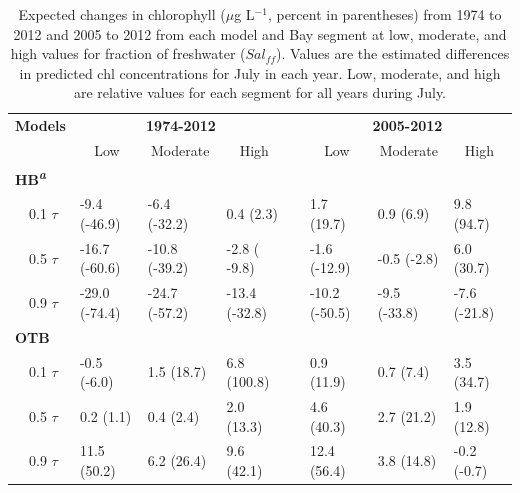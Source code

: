\documentclass{svjour3}\usepackage[]{graphicx}\usepackage[]{color}
\newcommand{\mugl}{$\mu$g L$^{-1}$}
\begin{document}
\begin{table}[!tbp]
\caption{Expected changes in chlorophyll (\mugl, percent in parentheses) from 1974 to 2012 and 2005 to 2012 from each model and Bay segment at low, moderate, and high values for fraction of freshwater ($Sal_{ff}$).  Values are the estimated differences in predicted \ac{chl} concentrations for July in each year.  Low, moderate, and high are relative values for each segment for all years during July.\label{tab:trendest}} 
\begin{center}
\begin{tabular}{llllclll}
\hline\hline
\multicolumn{1}{l}{\bfseries {\bf Models}}&\multicolumn{3}{c}{\bfseries 1974-2012}&\multicolumn{1}{c}{\bfseries }&\multicolumn{3}{c}{\bfseries 2005-2012}\tabularnewline
\cline{2-4} \cline{6-8}
\multicolumn{1}{l}{}&\multicolumn{1}{c}{Low}&\multicolumn{1}{c}{Moderate}&\multicolumn{1}{c}{High}&\multicolumn{1}{c}{}&\multicolumn{1}{c}{Low}&\multicolumn{1}{c}{Moderate}&\multicolumn{1}{c}{High}\tabularnewline
\hline
{\bfseries HB\textsuperscript{\textit{a}}}&&&&&&&\tabularnewline
~~0.1 $\tau$&-9.4 {\footnotesize (-46.9)}&-6.4 {\footnotesize (-32.2)}&0.4 {\footnotesize (2.3)}&&1.7 {\footnotesize (19.7)}&0.9 {\footnotesize (6.9)}& 9.8 {\footnotesize (94.7)}\tabularnewline
~~0.5 $\tau$&-16.7 {\footnotesize (-60.6)}&-10.8 {\footnotesize (-39.2)}&-2.8 {\footnotesize ( -9.8)}&&-1.6 {\footnotesize (-12.9)}&-0.5 {\footnotesize (-2.8)}&6.0 {\footnotesize (30.7)}\tabularnewline
~~0.9 $\tau$&-29.0 {\footnotesize (-74.4)}&-24.7 {\footnotesize (-57.2)}&-13.4 {\footnotesize (-32.8)}&&-10.2 {\footnotesize (-50.5)}&-9.5 {\footnotesize (-33.8)}&-7.6 {\footnotesize (-21.8)}\tabularnewline
\hline
{\bfseries OTB}&&&&&&&\tabularnewline
~~0.1 $\tau$&-0.5 {\footnotesize (-6.0)}&1.5 {\footnotesize (18.7)}&6.8 {\footnotesize (100.8)}&&0.9 {\footnotesize (11.9)}&0.7 {\footnotesize (7.4)}&3.5 {\footnotesize (34.7)}\tabularnewline
~~0.5 $\tau$&0.2 {\footnotesize (1.1)}&0.4 {\footnotesize (2.4)}&2.0 {\footnotesize (13.3)}&&4.6 {\footnotesize (40.3)}&2.7 {\footnotesize (21.2)}&1.9 {\footnotesize (12.8)}\tabularnewline
~~0.9 $\tau$&11.5 {\footnotesize (50.2)}&6.2 {\footnotesize (26.4)}& 9.6 {\footnotesize (42.1)}&&12.4 {\footnotesize (56.4)}&3.8 {\footnotesize (14.8)}&-0.2 {\footnotesize (-0.7)}\tabularnewline

\end{tabular}
\end{center}
\end{table}
\end{document}
